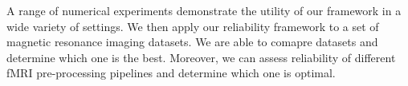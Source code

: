 \documentclass[a4paper]{article}
\begin{document}
\noindent A range of numerical experiments demonstrate the utility of our framework in a wide variety of settings. We then apply our reliability framework to a set of magnetic resonance imaging datasets. We are able to comapre datasets and determine which one is the best. Moreover, we can assess reliability of different fMRI pre-processing pipelines and determine which one is optimal. 
\end{document}
